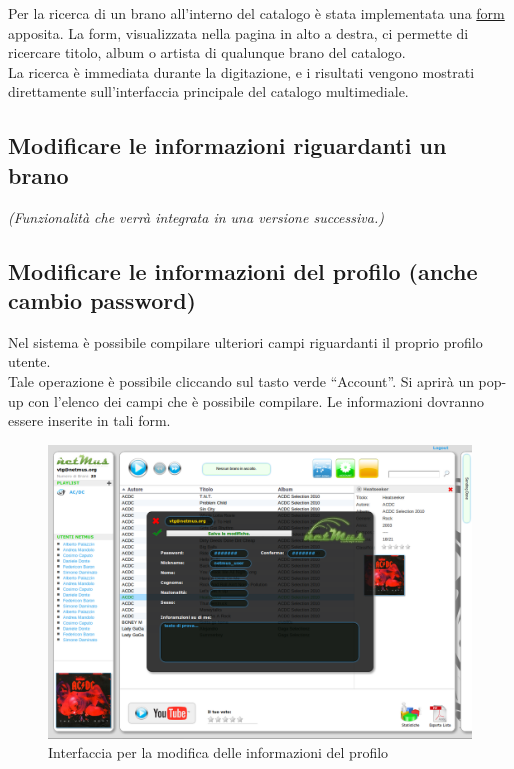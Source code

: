 Per la ricerca di un brano all'interno del catalogo \`e stata implementata una
\underline{form} apposita. La form, visualizzata nella pagina in alto a destra,
ci permette di ricercare titolo, album o artista di qualunque brano del catalogo.\\
La ricerca \`e immediata durante la digitazione, e i risultati vengono mostrati
direttamente sull'interfaccia principale del catalogo multimediale.

\subsection*{Modificare le informazioni riguardanti un brano}

\emph{(Funzionalità che verrà integrata in una versione successiva.)}

\subsection*{Modificare le informazioni del profilo (anche cambio password)}

Nel sistema  \`e possibile compilare ulteriori campi riguardanti il
proprio profilo utente.\\
Tale operazione \`e possibile cliccando sul tasto verde ``Account''. Si aprir\`a
un pop-up con l'elenco dei campi che \`e possibile compilare. Le informazioni
dovranno essere inserite in tali form.
\begin{figure}[htbp]
  \centering
  \includegraphics[width=15cm]{img/MU/profile_view.png}
\caption{Interfaccia per la modifica delle informazioni del profilo}
\end{figure}

